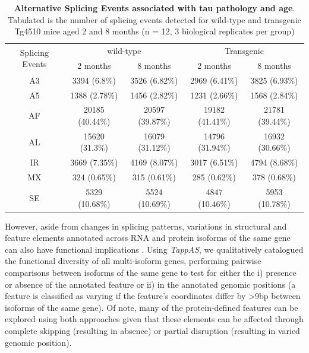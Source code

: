 \vspace{0.5cm}
\begin{table}[!htp]
	\centering
	\captionsetup{width=1\textwidth}
	\caption[Alternative Splicing Events associated with tau pathology and age]%
	{\textbf{Alternative Splicing Events associated with tau pathology and age}. Tabulated is the number of splicing events detected for wild-type and transgenic Tg4510 mice aged 2 and 8 months (n = 12, 3 biological replicates per group)}
	\begin{tabular}{@{}ccccc@{}}
		\toprule
		\multirow{2}{*}{Splicing Events} & \multicolumn{2}{c}{wild-type} & \multicolumn{2}{c}{Transgenic} \\ \cmidrule(l){2-5} 
		& 2 months        & 8 months        & 2 months        & 8 months        \\ \midrule
		A3 & 3394 (6.8\%)    & 3526 (6.82\%)   & 2969 (6.41\%)   & 3825 (6.93\%)   \\
		A5 & 1388 (2.78\%)   & 1456 (2.82\%)   & 1231 (2.66\%)   & 1568 (2.84\%)   \\
		AF & 20185 (40.44\%) & 20597 (39.87\%) & 19182 (41.41\%) & 21781 (39.44\%) \\
		AL & 15620 (31.3\%)  & 16079 (31.12\%) & 14796 (31.94\%) & 16932 (30.66\%) \\
		IR & 3669 (7.35\%)   & 4169 (8.07\%)   & 3017 (6.51\%)   & 4794 (8.68\%)   \\
		MX & 324 (0.65\%)    & 315 (0.61\%)    & 285 (0.62\%)    & 378 (0.68\%)    \\
		SE & 5329 (10.68\%)  & 5524 (10.69\%)  & 4847 (10.46\%)  & 5953 (10.78\%)  \\ \bottomrule
	\end{tabular}
	\label{AS_WholeTranscriptome_diff}
\end{table}

However, aside from changes in splicing patterns, variations in structural and feature elements annotated across RNA and protein isoforms of the same gene can also have functional implications \cite{DeLaFuente2020}. Using \textit{TappAS}\cite{DeLaFuente2020}, we qualitatively catalogued the functional diversity of all multi-isoform genes, performing pairwise comparisons between isoforms of the same gene to test for either the i) presence or absence of the annotated feature or ii) in the annotated genomic positions (a feature is classified as varying if the feature's coordinates differ by >9bp between isoforms of the same gene). Of note, many of the protein-defined features can be explored using both approaches given that these elements can be affected through complete skipping (resulting in absence) or partial disruption (resulting in varied genomic position).

